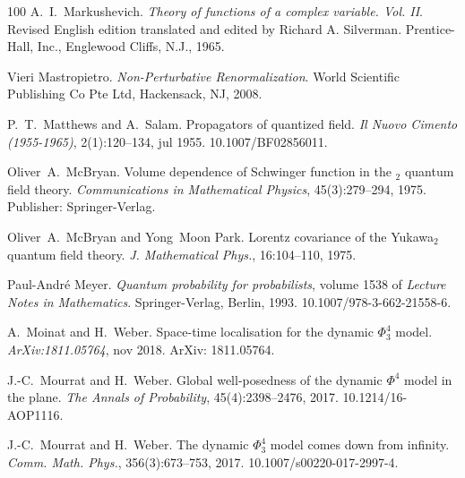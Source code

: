 \documentclass{article}
\newcommand{\tmrsub}[1]{\ensuremath{_{\textrm{#1}}}}
\newcommand{\tmtextit}[1]{{\itshape{#1}}}
\begin{document}
\begin{thebibliography}{100}
  A.~I.~Markushevich.
  {\newblock}\tmtextit{Theory of functions of a complex variable. Vol. II}.
  {\newblock}Revised English edition translated and edited by Richard A.
  Silverman. Prentice-Hall, Inc., Englewood Cliffs, N.J., 1965.{\newblock}
  
  Vieri Mastropietro.
  {\newblock}\tmtextit{Non-Perturbative Renormalization}. {\newblock}World
  Scientific Publishing Co Pte Ltd, Hackensack, NJ, 2008.{\newblock}
  
  P.~T.~Matthews  and  A.~Salam.
  {\newblock}Propagators of quantized field. {\newblock}\tmtextit{Il Nuovo
  Cimento (1955-1965)}, 2(1):120--134, jul 1955.
  {\newblock}\href{Https://doi.org/10.1007/BF02856011}{}10.1007/BF02856011.{\newblock}
  
  Oliver~A.~McBryan. {\newblock}Volume
  dependence of Schwinger function in the \tmrsub{$2$} quantum
  field theory. {\newblock}\tmtextit{Communications in Mathematical Physics},
  45(3):279--294, 1975. {\newblock}Publisher: Springer-Verlag.{\newblock}
  
  Oliver~A.~McBryan  and  Yong~Moon Park.
  {\newblock}Lorentz covariance of the Yukawa\tmrsub{$2$} quantum field
  theory. {\newblock}\tmtextit{J. Mathematical Phys.}, 16:104--110,
  1975.{\newblock}
  
  Paul-Andr{\'e} Meyer. {\newblock}\tmtextit{Quantum
  probability for probabilists},  volume  1538  of \tmtextit{Lecture Notes in
  Mathematics}. {\newblock}Springer-Verlag, Berlin, 1993.
  {\newblock}\href{Https://doi.org/10.1007/978-3-662-21558-6}{}10.1007/978-3-662-21558-6.{\newblock}
  
  A.~Moinat  and  H.~Weber.
  {\newblock}Space-time localisation for the dynamic $\Phi^4_3$ model.
  {\newblock}\tmtextit{ArXiv:1811.05764}, nov 2018. {\newblock}ArXiv:
  1811.05764.{\newblock}
  
  J.-C.~Mourrat  and  H.~Weber.
  {\newblock}Global well-posedness of the dynamic $\Phi^4$ model in the plane.
  {\newblock}\tmtextit{The Annals of Probability}, 45(4):2398--2476, 2017.
  {\newblock}\href{Https://doi.org/10.1214/16-AOP1116}{}10.1214/16-AOP1116.{\newblock}
  
  J.-C.~Mourrat  and  H.~Weber. {\newblock}The
  dynamic $\Phi^4_3$ model comes down from infinity.
  {\newblock}\tmtextit{Comm. Math. Phys.}, 356(3):673--753, 2017.
  {\newblock}\href{Https://doi.org/10.1007/s00220-017-2997-4}{}10.1007/s00220-017-2997-4.{\newblock}
  

\end{thebibliography}
\end{document}
